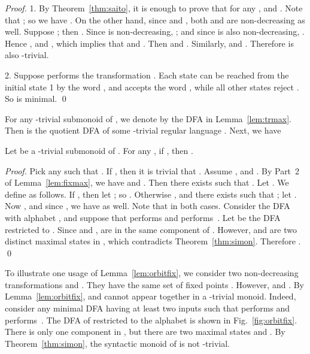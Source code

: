 \documentclass{llncs}
\newcommand{\qedb}{\hfill}
\begin{document}
\begin{proof}
1. By Theorem~\ref{thm:saito}, it is enough to prove that for any ,  and . Note that ; so we have . On the other hand, since  and , both  and  are non-decreasing as well. Suppose ; then . Since  is non-decreasing, ; and since  is also non-decreasing, . Hence , and , which implies that  and . Then  and . Similarly,  and . Therefore  is also -trivial. 


2. Suppose  performs the transformation . Each state  can be reached from the initial state 1 by the word , and  accepts the word , while all other states reject . So  is minimal. \qed
\end{proof}


For any -trivial submonoid  of , we denote by  the DFA in Lemma~\ref{lem:trmax}. Then  is the quotient DFA of some -trivial regular language . Next, we have

\begin{lemma}\label{lem:orbitfix} 
Let  be a -trivial submonoid of . For any , 
if , then . 
\end{lemma}

\begin{proof}
Pick any  such that . If , then it is trivial that . Assume , and . By Part~2 of Lemma~\ref{lem:fixmax}, we have  and . Then there exists  such that . Let . We define  as follows. If , then let ; so . Otherwise , and there exists  such that ; let . Now , and since , we have  as well. Note that  in both cases. Consider the DFA  with alphabet , and suppose that  performs  and  performs~. Let  be the DFA  restricted to . Since  and ,  are in the same component  of . However,  and  are two distinct maximal states in , which contradicts Theorem~\ref{thm:simon}. Therefore . \qed
\end{proof}



\begin{example}\label{ex:orbitfix}
To illustrate one usage of Lemma~\ref{lem:orbitfix}, we consider two non-decreasing transformations  and . They have the same set of fixed points . However,  and . By Lemma~\ref{lem:orbitfix},  and  cannot appear together in a -trivial monoid. Indeed, consider any minimal DFA  having at least two inputs  such that  performs  and  performs~. The DFA  of  restricted to the alphabet  is shown in Fig.~\ref{fig:orbitfix}. There is only one component in , but there are two maximal states  and . By Theorem~\ref{thm:simon}, the syntactic monoid of  is not -trivial. \qedb
\end{example}
\end{document}
